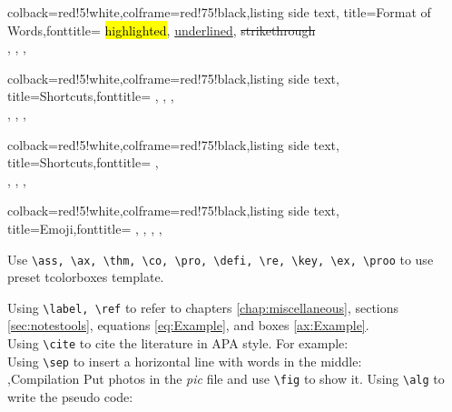 \documentclass[12pt]{report}
\begin{document}
\begin{tcblisting}{colback=red!5!white,colframe=red!75!black,listing side text,
        title=Format of Words,fonttitle=\bfseries}
    \hl{highlighted}, \ul{underlined}, \st{strikethrough}\\
    , , , 
\end{tcblisting}
\begin{tcblisting}{colback=red!5!white,colframe=red!75!black,listing side text,
        title=Shortcuts,fonttitle=\bfseries}
    \RR, \NN, \ZZ, \QQ\\
    \bA, \bB, \bC, \bD
\end{tcblisting}
\begin{tcblisting}{colback=red!5!white,colframe=red!75!black,listing side text,
        title=Shortcuts,fonttitle=\bfseries}
    , \\
    \cA, \cB, \cC, \cD
\end{tcblisting}
\begin{tcblisting}{colback=red!5!white,colframe=red!75!black,listing side text,
        title=Emoji,fonttitle=\bfseries}
    \emogood, \emobad, \emocool, \emoheart, \emotree
\end{tcblisting}

\no Use \verb=\ass, \ax, \thm, \co, \pro, \defi, \re, \key, \ex, \proo= to
\no use preset tcolorboxes template.
 \label{ax:Example}
 \label{pro:Example}

\no Using \verb=\label, \ref= to refer to chapters \ref{chap:miscellaneous},
sections \ref{sec:notestools}, equations \ref{eq:Example}, and boxes \ref{ax:Example}.\\
\no Using \verb=\cite= to cite the literature in APA style. For example:
\cite{Angrist}\\
\no Using \verb=\sep= to insert a horizontal line with words in the middle:\\
\sep{Compilation}
Put photos in the \textit{pic} file and use \verb|\fig| to show it.
Using \verb=\alg= to write the pseudo code:
\end{document}
